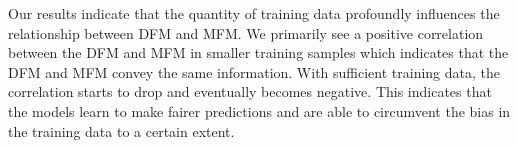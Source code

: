 \documentclass{article}
\begin{document}

Our results indicate that the quantity of training data profoundly
influences the relationship between DFM and MFM. We primarily see a
positive correlation between the DFM and MFM in smaller training
samples which indicates that the DFM and MFM convey the same
information. With sufficient training data, the correlation starts to
drop and eventually becomes negative. This indicates that the models
learn to make fairer predictions and are able to circumvent the bias
in the training data to a certain extent.





\end{document}
